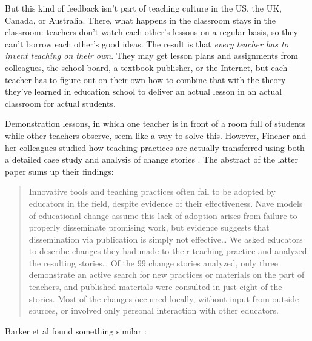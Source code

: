 But this kind of feedback isn't part of teaching culture in the US,
the UK, Canada, or Australia.  There, what happens in the classroom
stays in the classroom: teachers don't watch each other's lessons on a
regular basis, so they can't borrow each other's good ideas. The
result is that \emph{every teacher has to invent teaching on their
own}. They may get lesson plans and assignments from colleagues, the
school board, a textbook publisher, or the Internet, but each teacher
has to figure out on their own how to combine that with the theory
they've learned in education school to deliver an actual lesson in an
actual classroom for actual students.

Demonstration lessons, in which one teacher is in front of a room full
of students while other teachers observe, seem like a way to solve
this.  However, Fincher and her colleagues studied how teaching
practices are actually transferred using both a detailed case
study \cite{bib:fincher-warrens-questions} and analysis of change
stories \cite{bib:fincher-stories-change}.  The abstract of the latter
paper sums up their findings:

\begin{quote}

  Innovative tools and teaching practices often fail to be adopted by
  educators in the field, despite evidence of their effectiveness.
  Nave models of educational change assume this lack of adoption
  arises from failure to properly disseminate promising work, but
  evidence suggests that dissemination via publication is simply not
  effective{\ldots} We asked educators to describe changes they had
  made to their teaching practice and analyzed the resulting
  stories{\ldots} Of the 99 change stories analyzed, only three
  demonstrate an active search for new practices or materials on the
  part of teachers, and published materials were consulted in just
  eight of the stories. Most of the changes occurred locally, without
  input from outside sources, or involved only personal interaction
  with other educators.

\end{quote}

Barker et al found something similar \cite{bib:barker-practice-adoption}:

